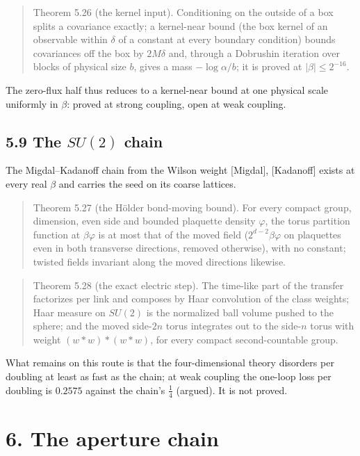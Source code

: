 \documentclass[10pt,letterpaper,twocolumn]{article}
\begin{document}
\begin{quote}
Theorem 5.26 (the kernel input). Conditioning on the outside of a box splits a covariance exactly; a kernel-near bound (the box kernel of an observable within \(\delta\) of a constant at every boundary condition) bounds covariances off the box by \(2M\delta\) and, through a Dobrushin iteration over blocks of physical size \(b\), gives a mass \(-\log\alpha/b\); it is proved at \(|\beta|\le2^{-16}\).
\end{quote}

The zero-flux half thus reduces to a kernel-near bound at one physical scale uniformly in \(\beta\): proved at strong coupling, open at weak coupling.

\subsection{\texorpdfstring{5.9 The \(SU(2)\) chain}{5.9 The SU(2) chain}}\label{59-the-su2-chain}

The Migdal--Kadanoff chain from the Wilson weight {[}Migdal{]}, {[}Kadanoff{]} exists at every real \(\beta\) and carries the seed on its coarse lattices.

\begin{quote}
Theorem 5.27 (the Hölder bond-moving bound). For every compact group, dimension, even side and bounded plaquette density \(\varphi\), the torus partition function at \(\beta\varphi\) is at most that of the moved field (\(2^{d-2}\beta\varphi\) on plaquettes even in both transverse directions, removed otherwise), with no constant; twisted fields invariant along the moved directions likewise.
\end{quote}

\begin{quote}
Theorem 5.28 (the exact electric step). The time-like part of the transfer factorizes per link and composes by Haar convolution of the class weights; Haar measure on \(SU(2)\) is the normalized ball volume pushed to the sphere; and the moved side-\(2n\) torus integrates out to the side-\(n\) torus with weight \((w\ast w)\ast(w\ast w)\), for every compact second-countable group.
\end{quote}

What remains on this route is that the four-dimensional theory disorders per doubling at least as fast as the chain; at weak coupling the one-loop loss per doubling is \(0.2575\) against the chain's \(\tfrac14\) (argued). It is not proved.

\section{6. The aperture chain}\label{6-the-aperture-chain}
\end{document}
